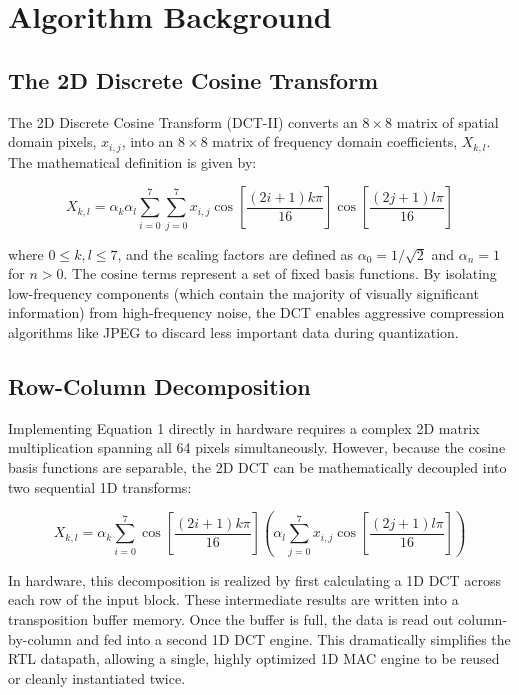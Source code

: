 \section{Algorithm Background}

\subsection{The 2D Discrete Cosine Transform}
The 2D Discrete Cosine Transform (DCT-II) converts an $8 \times 8$ matrix of spatial domain pixels, $x_{i,j}$, into an $8 \times 8$ matrix of frequency domain coefficients, $X_{k,l}$. The mathematical definition is given by:

\begin{equation}
    X_{k,l} = \alpha_k \alpha_l \sum_{i=0}^{7} \sum_{j=0}^{7} x_{i,j} \cos \left[ \frac{(2i+1)k\pi}{16} \right] \cos \left[ \frac{(2j+1)l\pi}{16} \right]
\end{equation}

where $0 \leq k, l \leq 7$, and the scaling factors are defined as $\alpha_0 = 1/\sqrt{2}$ and $\alpha_n = 1$ for $n > 0$. The cosine terms represent a set of fixed basis functions. By isolating low-frequency components (which contain the majority of visually significant information) from high-frequency noise, the DCT enables aggressive compression algorithms like JPEG to discard less important data during quantization.

\subsection{Row-Column Decomposition}
Implementing Equation 1 directly in hardware requires a complex 2D matrix multiplication spanning all 64 pixels simultaneously. However, because the cosine basis functions are separable, the 2D DCT can be mathematically decoupled into two sequential 1D transforms:

\begin{equation}
    X_{k,l} = \alpha_k \sum_{i=0}^{7} \cos \left[ \frac{(2i+1)k\pi}{16} \right] \left( \alpha_l \sum_{j=0}^{7} x_{i,j} \cos \left[ \frac{(2j+1)l\pi}{16} \right] \right)
\end{equation}

In hardware, this decomposition is realized by first calculating a 1D DCT across each row of the input block. These intermediate results are written into a transposition buffer memory. Once the buffer is full, the data is read out column-by-column and fed into a second 1D DCT engine. This dramatically simplifies the RTL datapath, allowing a single, highly optimized 1D MAC engine to be reused or cleanly instantiated twice.

